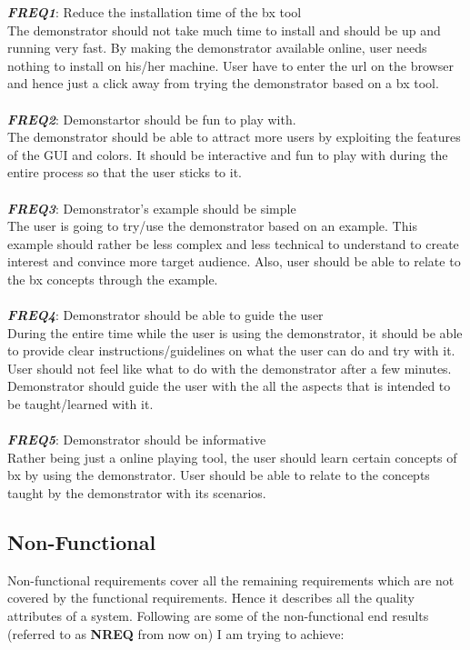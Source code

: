 \textbf{\textit{FREQ1}}: Reduce the installation time of the bx tool\\
The demonstrator should not take much time to install and should be up and running very fast. By making the demonstrator available online, user needs nothing to install on his/her machine. User have to enter the url on the browser and hence just a click away from trying the demonstrator based on a bx tool.\\\\
\textbf{\textit{FREQ2}}: Demonstartor should be fun to play with.\\
The demonstrator should be able to attract more users by exploiting the features of the GUI and colors. It should be interactive and fun to play with during the entire process so that the user sticks to it.\\\\
\textbf{\textit{FREQ3}}: Demonstrator's example should be simple\\
The user is going to try/use the demonstrator based on an example. This example should rather be less complex and less technical to understand to create interest and convince more target audience. Also, user should be able to relate to the bx concepts through the example.\\\\
\textbf{\textit{FREQ4}}: Demonstrator should be able to guide the user\\
During the entire time while the user is using the demonstrator, it should be able to provide clear instructions/guidelines on what the user can do and try with it. User should not feel like what to do with the demonstrator after a few minutes. Demonstrator should guide the user with the all the aspects that is intended to be taught/learned with it.\\\\
\textbf{\textit{FREQ5}}: Demonstrator should be informative\\
Rather being just a online playing tool, the user should learn certain concepts of bx by using the demonstrator. User should be able to relate to the concepts taught by the demonstrator with its scenarios.

\subsection{Non-Functional}\label{subsec:nonfunctionalreq}
Non-functional requirements cover all the remaining requirements which are not covered by the functional requirements. Hence it describes all the quality attributes of a system.
\newline\newline Following are some of the non-functional end results (referred to as \textbf{NREQ} from now on) I am trying to achieve:

